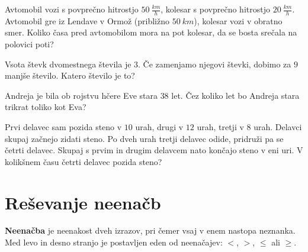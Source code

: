         


        
            \begin{naloga}
                Avtomobil vozi s povprečno hitrostjo $50~\frac{km}{h}$, kolesar s povprečno hitrostjo $20~\frac{km}{h}$.
                Avtomobil gre iz Lendave v Ormož (približno $50~km$), kolesar vozi v obratno smer. 
                Koliko časa pred avtomobilom mora na pot kolesar, da se bosta srečala na polovici poti?
                
            \end{naloga}

            \begin{naloga}
                Vsota števk dvomestnega števila je $3$. Če zamenjamo njegovi števki, dobimo za $9$ manjše število. Katero število je to?
                
            \end{naloga}

        


        
            \begin{naloga}
                Andreja je bila ob rojstvu hčere Eve stara $38$ let. Čez koliko let bo Andreja stara trikrat toliko kot Eva?
                
            \end{naloga}

            \begin{naloga}
                Prvi delavec sam pozida steno v  $10$ urah, drugi v $12$ urah, tretji v $8$ urah. 
                Delavci skupaj začnejo zidati steno. Po dveh urah tretji delavec odide, pridruži pa se četrti delavec. 
                Skupaj s prvim in drugim delavcem nato končajo steno v eni uri. V kolikšnem času četrti delavec pozida steno?
                
            \end{naloga}

        




            \newpage
    \section{Reševanje neenačb}

        

                \textbf{Neenačba} je neenakost dveh izrazov, pri čemer vsaj v enem nastopa neznanka.
                Med levo in desno stranjo je postavljen eden od neenačajev: $<$, $>$, $\leq$ ali $\geq$.

